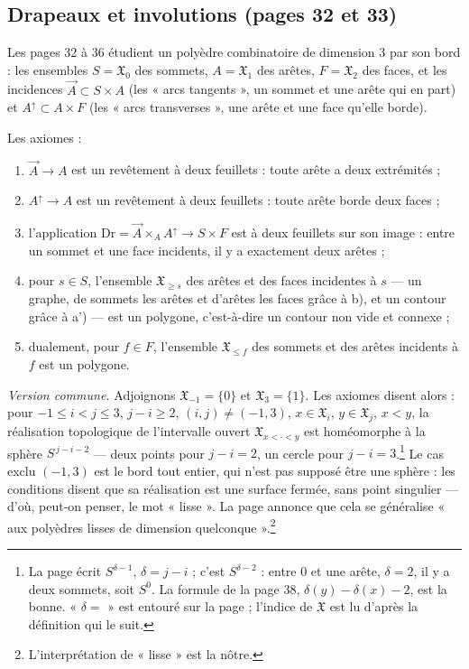 \documentclass[11pt,a4paper]{article}
\begin{document}
\subsection*{Drapeaux et involutions (pages 32 et 33)}

Les pages 32 à 36 étudient un polyèdre combinatoire de dimension 3 par son
bord : les ensembles $S = \mathfrak{X}_{0}$ des sommets, $A = \mathfrak{X}_{1}$
des arêtes, $F = \mathfrak{X}_{2}$ des faces, et les incidences
$\vec{A} \subset S \times A$ (les « arcs tangents », un sommet et une arête qui
en part) et $A^{\uparrow} \subset A \times F$ (les « arcs transverses », une
arête et une face qu'elle borde).


Les axiomes :
\begin{enumerate}
\item[a)] $\vec{A} \to A$ est un revêtement à deux feuillets : toute arête a deux
extrémités ;
\item[a')] $A^{\uparrow} \to A$ est un revêtement à deux feuillets : toute arête
borde deux faces ;
\item[b)] l'application $\mathrm{Dr} = \vec{A} \times_{A} A^{\uparrow} \to S \times
F$ est à deux feuillets sur son image : entre un sommet et une face incidents,
il y a exactement deux arêtes ;
\item[c)] pour $s \in S$, l'ensemble $\mathfrak{X}_{\geq s}$ des arêtes et des
faces incidentes à $s$ --- un graphe, de sommets les arêtes et d'arêtes les
faces grâce à b), et un contour grâce à a') --- est un polygone, c'est-à-dire un
contour non vide et connexe ;
\item[c')] dualement, pour $f \in F$, l'ensemble $\mathfrak{X}_{\leq f}$ des
sommets et des arêtes incidents à $f$ est un polygone.
\end{enumerate}

\emph{Version commune.} Adjoignons $\mathfrak{X}_{-1} = \{0\}$ et
$\mathfrak{X}_{3} = \{1\}$. Les axiomes disent alors : pour $-1 \leq i < j \leq
3$, $j - i \geq 2$, $(i,j) \neq (-1, 3)$, $x \in \mathfrak{X}_{i}$,
$y \in \mathfrak{X}_{j}$, $x < y$, la réalisation topologique de l'intervalle
ouvert $\mathfrak{X}_{x < \cdot < y}$ est homéomorphe à la sphère
$S^{\,j - i - 2}$ --- deux points pour $j - i = 2$, un cercle pour
$j - i = 3$.\footnote{La page écrit $S^{\delta - 1}$, $\delta = j - i$ ; c'est
$S^{\delta - 2}$ : entre $0$ et une arête, $\delta = 2$, il y a deux sommets,
soit $S^{0}$. La formule de la page 38, $\delta(y) - \delta(x) - 2$, est la
bonne. « $\delta =$ » est entouré sur la page ; l'indice de $\mathfrak{X}$ est lu
d'après la définition qui le suit.} Le cas exclu $(-1, 3)$ est le bord tout
entier, qui n'est pas supposé être une sphère : les conditions disent que sa
réalisation est une surface fermée, sans point singulier --- d'où, peut-on
penser, le mot « lisse ». La page annonce que cela se généralise « aux polyèdres
lisses de dimension quelconque ».\footnote{L'interprétation de « lisse » est la
nôtre.}
\end{document}
